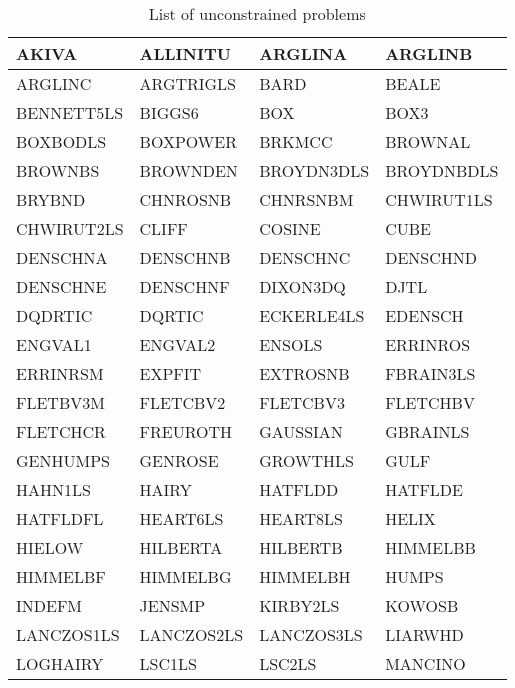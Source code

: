 \begin{longtable}{llll}
    \caption{List of unconstrained problems}\\
    \toprule
    AKIVA       & ALLINITU      & ARGLINA       & ARGLINB\\
    \midrule
    ARGLINC     & ARGTRIGLS     & BARD          & BEALE\\
    \midrule
    BENNETT5LS  & BIGGS6        & BOX           & BOX3\\
    \midrule
    BOXBODLS    & BOXPOWER      & BRKMCC        & BROWNAL\\
    \midrule
    BROWNBS     & BROWNDEN      & BROYDN3DLS    & BROYDNBDLS\\
    \midrule
    BRYBND      & CHNROSNB      & CHNRSNBM      & CHWIRUT1LS\\
    \midrule
    CHWIRUT2LS  & CLIFF         & COSINE        & CUBE\\
    \midrule
    DENSCHNA    & DENSCHNB      & DENSCHNC      & DENSCHND\\
    \midrule
    DENSCHNE    & DENSCHNF      & DIXON3DQ      & DJTL\\
    \midrule
    DQDRTIC     & DQRTIC        & ECKERLE4LS    & EDENSCH\\
    \midrule
    ENGVAL1     & ENGVAL2       & ENSOLS        & ERRINROS\\
    \midrule
    ERRINRSM    & EXPFIT        & EXTROSNB      & FBRAIN3LS\\
    \midrule
    FLETBV3M    & FLETCBV2      & FLETCBV3      & FLETCHBV\\
    \midrule
    FLETCHCR    & FREUROTH      & GAUSSIAN      & GBRAINLS\\
    \midrule
    GENHUMPS    & GENROSE       & GROWTHLS      & GULF\\
    \midrule
    HAHN1LS     & HAIRY         & HATFLDD       & HATFLDE\\
    \midrule
    HATFLDFL    & HEART6LS      & HEART8LS      & HELIX\\
    \midrule
    HIELOW      & HILBERTA      & HILBERTB      & HIMMELBB\\
    \midrule
    HIMMELBF    & HIMMELBG      & HIMMELBH      & HUMPS\\
    \midrule
    INDEFM      & JENSMP        & KIRBY2LS      & KOWOSB\\
    \midrule
    LANCZOS1LS  & LANCZOS2LS    & LANCZOS3LS    & LIARWHD\\
    \midrule
    LOGHAIRY    & LSC1LS        & LSC2LS        & MANCINO\\

\end{longtable}

